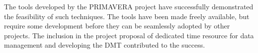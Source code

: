 \documentclass[gmd, manuscript]{copernicus}
\begin{document}
The tools developed by the PRIMAVERA project have successfully demonstrated the feasibility of such techniques. The tools have been made freely available, but require some development before they can be seamlessly adopted by other projects. The inclusion in the project proposal of dedicated time resource for data management and developing the DMT contributed to the success.













%


\noappendix       %


\end{document}
